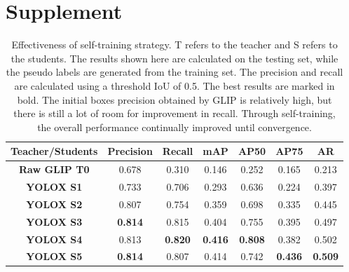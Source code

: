\documentclass[runningheads]{llncs}
\begin{document}
%
%
\section*{Supplement}
\begin{table}[h]
\caption{Effectiveness of self-training strategy. T refers to the teacher and S refers to the students. The results shown here are calculated on the testing set, while the pseudo labels are generated from the training set. The precision and recall are calculated using a threshold IoU of 0.5. The best results are marked in bold. The initial boxes precision obtained by GLIP is relatively high, but there is still a lot of room for improvement in recall. Through self-training, the overall performance continually improved until convergence.}
\begin{center}
\begin{tabular}{c|cccccc}
\hline
\textbf{Teacher/Students} & \textbf{Precision} & \textbf{Recall} & \textbf{mAP} & \textbf{AP50} & \textbf{AP75} & \textbf{AR} \\ \hline
\textbf{Raw GLIP T0} & 0.678          & 0.310          & 0.146          & 0.252          & 0.165          & 0.213          \\
\textbf{YOLOX S1}    & 0.733          & 0.706         & 0.293          & 0.636          & 0.224          & 0.397          \\
\textbf{YOLOX S2}    & 0.807          & 0.754         & 0.359          & 0.698          & 0.335          & 0.445          \\
\textbf{YOLOX S3}    & \textbf{0.814} & 0.815         & 0.404          & 0.755          & 0.395          & 0.497          \\
\textbf{YOLOX S4}    & 0.813          & \textbf{0.820} & \textbf{0.416} & \textbf{0.808} & 0.382          & 0.502          \\
\textbf{YOLOX S5}    & \textbf{0.814} & 0.807         & 0.414          & 0.742          & \textbf{0.436} & \textbf{0.509} \\ \hline
\end{tabular}
\vskip -0.45in
\label{tab：self}
\end{center}
\end{table}
\end{document}
